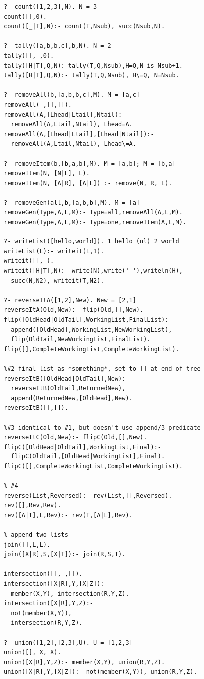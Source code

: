 \documentclass[8pt,letterpaper,twocolumn]{article}
\begin{document}
\begin{verbatim}
?- count([1,2,3],N). N = 3
count([],0).
count([_|T],N):- count(T,Nsub), succ(Nsub,N).

?- tally([a,b,b,c],b,N). N = 2
tally([],_,0).
tally([H|T],Q,N):-tally(T,Q,Nsub),H=Q,N is Nsub+1.
tally([H|T],Q,N):- tally(T,Q,Nsub), H\=Q, N=Nsub.

?- removeAll(b,[a,b,b,c],M). M = [a,c]
removeAll(_,[],[]).
removeAll(A,[Lhead|Ltail],Ntail):-
  removeAll(A,Ltail,Ntail), Lhead=A.
removeAll(A,[Lhead|Ltail],[Lhead|Ntail]):-
  removeAll(A,Ltail,Ntail), Lhead\=A.

?- removeItem(b,[b,a,b],M). M = [a,b]; M = [b,a]
removeItem(N, [N|L], L).
removeItem(N, [A|R], [A|L]) :- remove(N, R, L).

?- removeGen(all,b,[a,b,b],M). M = [a]
removeGen(Type,A,L,M):- Type=all,removeAll(A,L,M).
removeGen(Type,A,L,M):- Type=one,removeItem(A,L,M).

?- writeList([hello,world]). 1 hello (nl) 2 world
writeList(L):- writeit(L,1).
writeit([],_).
writeit([H|T],N):- write(N),write(' '),writeln(H),
  succ(N,N2), writeit(T,N2).

?- reverseItA([1,2],New). New = [2,1]
reverseItA(Old,New):- flip(Old,[],New).
flip([OldHead|OldTail],WorkingList,FinalList):-
  append([OldHead],WorkingList,NewWorkingList),
  flip(OldTail,NewWorkingList,FinalList).
flip([],CompleteWorkingList,CompleteWorkingList).

%#2 final list as *something*, set to [] at end of tree
reverseItB([OldHead|OldTail],New):-
  reverseItB(OldTail,ReturnedNew),
  append(ReturnedNew,[OldHead],New).
reverseItB([],[]).

%#3 identical to #1, but doesn't use append/3 predicate
reverseItC(Old,New):- flipC(Old,[],New).
flipC([OldHead|OldTail],WorkingList,Final):-
  flipC(OldTail,[OldHead|WorkingList],Final).
flipC([],CompleteWorkingList,CompleteWorkingList).

% #4
reverse(List,Reversed):- rev(List,[],Reversed).
rev([],Rev,Rev).
rev([A|T],L,Rev):- rev(T,[A|L],Rev).

% append two lists
join([],L,L).
join([X|R],S,[X|T]):- join(R,S,T).

intersection([],_,[]).
intersection([X|R],Y,[X|Z]):-
  member(X,Y), intersection(R,Y,Z).
intersection([X|R],Y,Z):-
  not(member(X,Y)),
  intersection(R,Y,Z).

?- union([1,2],[2,3],U). U = [1,2,3]
union([], X, X).
union([X|R],Y,Z):- member(X,Y), union(R,Y,Z).
union([X|R],Y,[X|Z]):- not(member(X,Y)), union(R,Y,Z).


\end{verbatim}
\end{document}
